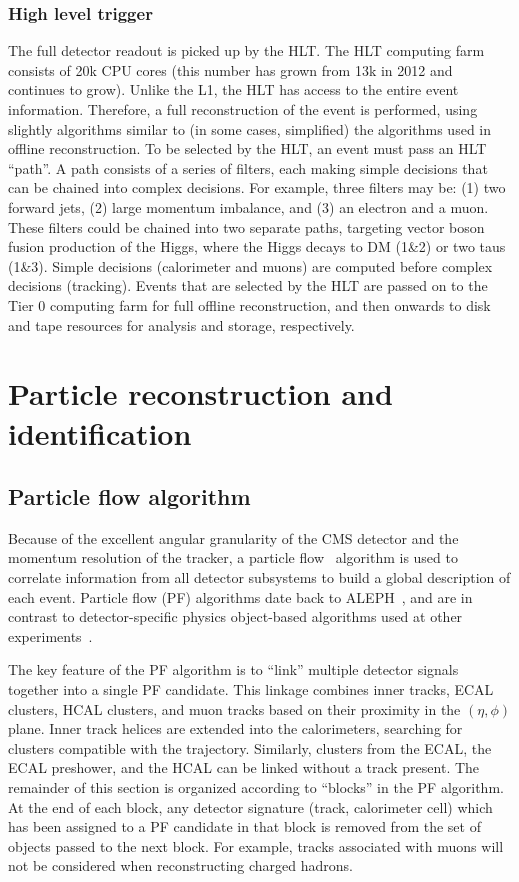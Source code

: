 \subsubsection{High level trigger}

The full detector readout is picked up by the HLT.
The HLT computing farm consists of 20k CPU cores (this number has grown from 13k in 2012 and continues to grow).
Unlike the L1, the HLT has access to the entire event information.
Therefore, a full reconstruction of the event is performed, using slightly algorithms similar to (in some cases, simplified) the algorithms used in offline reconstruction.
To be selected by the HLT, an event must pass an HLT ``path''.
A path consists of a series of filters, each making simple decisions that can be chained into complex decisions.
For example, three filters may be: (1) two forward jets, (2) large momentum imbalance, and (3) an electron and a muon.
These filters could be chained into two separate paths, targeting vector boson fusion production of the Higgs, where the Higgs decays to DM (1\&2) or two taus (1\&3).
Simple decisions (calorimeter and muons) are computed before complex decisions (tracking).
Events that are selected by the HLT are passed on to the Tier 0 computing farm for full offline reconstruction, and then onwards to disk and tape resources for analysis and storage, respectively.



\section{Particle reconstruction and identification}

\subsection{Particle flow algorithm}

Because of the excellent angular granularity of the CMS detector and the momentum resolution of the tracker, a particle flow~\cite{cmspf} algorithm is used to correlate information from all detector subsystems to build a global description of each event.
Particle flow (PF) algorithms date back to ALEPH~\needcite, and are in contrast to detector-specific physics object-based algorithms used at other experiments~\needcite.

The key feature of the PF algorithm is to ``link'' multiple detector signals together into a single PF candidate.
This linkage combines inner tracks, ECAL clusters, HCAL clusters, and muon tracks based on their proximity in the $(\eta,\phi)$ plane.
Inner track helices are extended into the calorimeters, searching for clusters compatible with the trajectory.
Similarly, clusters from the ECAL, the ECAL preshower, and the HCAL can be linked without a track present. 
The remainder of this section is organized according to ``blocks'' in the PF algorithm.
At the end of each block, any detector signature (track, calorimeter cell) which has been assigned to a PF candidate in that block is removed from the set of objects passed to the next block.
For example, tracks associated with muons will not be considered when reconstructing charged hadrons. 


